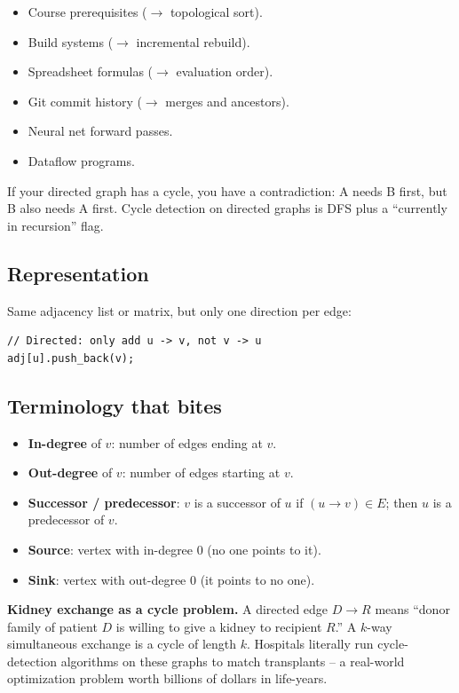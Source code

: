 \documentclass[11pt]{article}
\begin{document}
\begin{itemize}[leftmargin=*]
    \item Course prerequisites ($\to$ topological sort).
    \item Build systems ($\to$ incremental rebuild).
    \item Spreadsheet formulas ($\to$ evaluation order).
    \item Git commit history ($\to$ merges and ancestors).
    \item Neural net forward passes.
    \item Dataflow programs.
\end{itemize}

If your directed graph has a cycle, you have a contradiction: A needs B first, but B also needs A first. Cycle detection on directed graphs is DFS plus a ``currently in recursion'' flag.

\subsection*{Representation}

Same adjacency list or matrix, but only one direction per edge:

\begin{lstlisting}[basicstyle=\ttfamily\small,frame=single]
// Directed: only add u -> v, not v -> u
adj[u].push_back(v);
\end{lstlisting}

\subsection*{Terminology that bites}

\begin{itemize}[leftmargin=*]
    \item \textbf{In-degree} of $v$: number of edges ending at $v$.
    \item \textbf{Out-degree} of $v$: number of edges starting at $v$.
    \item \textbf{Successor / predecessor}: $v$ is a successor of $u$ if $(u \to v) \in E$; then $u$ is a predecessor of $v$.
    \item \textbf{Source}: vertex with in-degree 0 (no one points to it).
    \item \textbf{Sink}: vertex with out-degree 0 (it points to no one).
\end{itemize}

\begin{examplebox}
\textbf{Kidney exchange as a cycle problem.} A directed edge $D \to R$ means ``donor family of patient $D$ is willing to give a kidney to recipient $R$.'' A $k$-way simultaneous exchange is a cycle of length $k$. Hospitals literally run cycle-detection algorithms on these graphs to match transplants -- a real-world optimization problem worth billions of dollars in life-years.
\end{examplebox}
\end{document}
